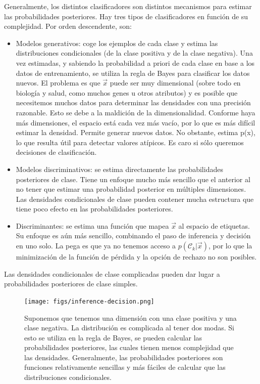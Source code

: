 Generalmente, los distintos clasificadores son distintos mecanismos para estimar las probabilidades posteriores. Hay tres tipos de clasificadores en función de su complejidad. Por orden descendente, son:
\begin{itemize}
\item Modelos generativos: coge los ejemplos de cada clase y estima las distribuciones condicionales (de la clase positiva y de la clase negativa). Una vez estimadas, y sabiendo la probabilidad a priori de cada clase en base a los datos de entrenamiento, se utiliza la regla de Bayes para clasificar los datos nuevos.
El problema es que $\vec{x}$ puede ser muy dimensional (sobre todo en biología y salud, como muchos genes u otros atributos) y es posible que necesitemos muchos datos para determinar las densidades con una precisión razonable. Esto se debe a la maldición de la dimensionalidad. Conforme haya más dimensiones, el espacio está cada vez más vacío, por lo que es más difícil estimar la densidad. Permite generar nuevos datos. No obstante, estima p(x), lo que resulta útil para detectar valores atípicos. Es caro si sólo queremos decisiones de clasificación.

\item Modelos discriminativos: se estima directamente las probabilidades posteriores de clase. Tiene un enfoque mucho más sencillo que el anterior al no tener que estimar una probabilidad posterior en múltiples dimensiones. Las densidades condicionales de clase pueden contener mucha estructura que tiene poco efecto en las probabilidades posteriores.

\item Discriminantes: se estima una función que mapea $\vec{x}$ al espacio de etiquetas. Su enfoque es aún más sencillo, combinando el paso de inferencia y decisión en uno solo. La pega es que ya no tenemos acceso a $p(\mathcal{C}_k|\vec{x})$, por lo que la minimización de la función de pérdida y la opción de rechazo no son posibles.
\end{itemize}

Las densidades condicionales de clase complicadas pueden dar lugar a probabilidades posteriores de clase simples.
\begin{figure}[h]
\centering
\texttt{[image: figs/inference-decision.png]}
\caption{Suponemos que tenemos una dimensión con una clase positiva y una clase negativa. La distribución es complicada al tener dos modas. Si esto se utiliza en la regla de Bayes, se pueden calcular las probabilidades posteriores, las cuales tienen menos complejidad que las densidades. Generalmente, las probabilidades posteriores son funciones relativamente sencillas y más fáciles de calcular que las distribuciones condicionales.}
\end{figure}

